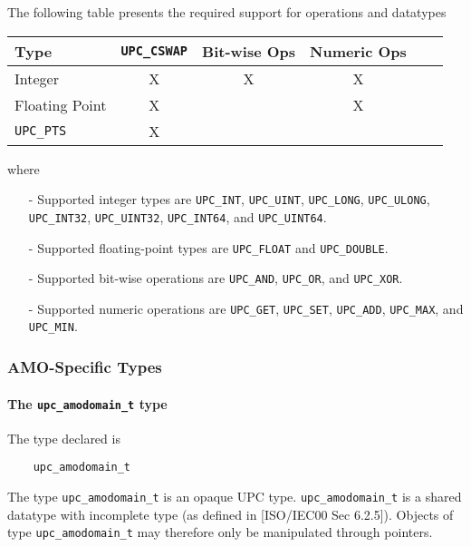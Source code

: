 \np The following table presents the required support for operations and
    datatypes

\begin{center}
\begin{tabular}{l|ccccc}
Type           & {\tt UPC\_CSWAP} & Bit-wise Ops & Numeric Ops \\ \hline
Integer        &  X               &  X           &  X          \\
Floating Point &  X               &              &  X          \\
{\tt UPC\_PTS} &  X               &              &             \\
\end{tabular}
\end{center}

    where
\begin{itemize}
  \item[-] Supported integer types are {\tt UPC\_INT}, {\tt UPC\_UINT},
    {\tt UPC\_LONG}, {\tt UPC\_ULONG}, {\tt UPC\_INT32}, {\tt UPC\_UINT32},
    {\tt UPC\_INT64}, and {\tt UPC\_UINT64}.
  \item[-] Supported floating-point types are {\tt UPC\_FLOAT} and
    {\tt UPC\_DOUBLE}.
  \item[-] Supported bit-wise operations are {\tt UPC\_AND}, {\tt UPC\_OR},
    and {\tt UPC\_XOR}.
  \item[-] Supported numeric operations are {\tt UPC\_GET}, {\tt UPC\_SET},
    {\tt UPC\_ADD}, {\tt UPC\_MAX}, and {\tt UPC\_MIN}.
\end{itemize}

\subsubsection{AMO-Specific Types}
\label{upc-amo-types}

\paragraph{The {\tt upc\_amodomain\_t} type}

\npf The type declared is
\begin{verbatim}
    upc_amodomain_t
\end{verbatim}

\np The type {\tt upc\_amodomain\_t} is an opaque UPC type.
    {\tt upc\_amodomain\_t} is a shared datatype with incomplete type (as 
    defined in [ISO/IEC00 Sec 6.2.5]).  Objects of type {\tt upc\_amodomain\_t}
    may therefore only be manipulated through pointers.

